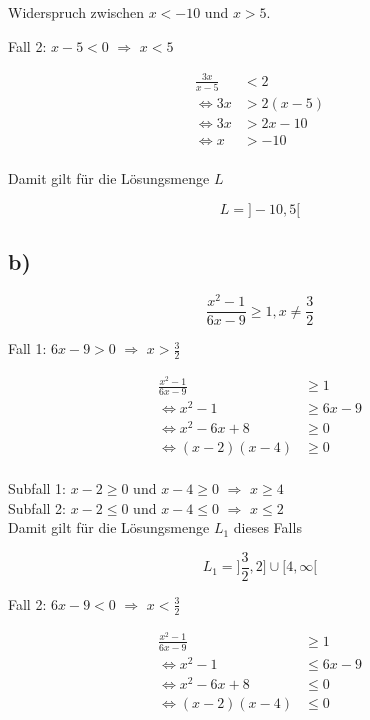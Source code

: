 \documentclass[a4paper, 11pt]{article}
\begin{document}
Widerspruch zwischen \(x < -10\) und \(x > 5\).

Fall 2: \(x - 5 < 0\) \(\Rightarrow\) \(x < 5\)

\begin{align*}
    \frac{3x}{x-5} &< 2 \\
    \Leftrightarrow 3x &> 2(x-5) \\
    \Leftrightarrow 3x &> 2x-10 \\
    \Leftrightarrow x &> -10 \\
\end{align*}

Damit gilt für die Lösungsmenge \(L\)

$$ L = ]-10, 5[ $$

\pagebreak

\subsection{b)}
\label{sec:org7f8df0d}
$$ \frac{x^2 - 1}{6x - 9} \geq 1, x \neq \frac{3}{2} $$

Fall 1: \(6x - 9 > 0\) \(\Rightarrow\) \(x > \frac{3}{2}\)

\begin{align*}
     \frac{x^2 - 1}{6x - 9} &\geq 1 \\
    \Leftrightarrow x^2 - 1 &\geq 6x - 9 \\
    \Leftrightarrow x^2 - 6x + 8 &\geq 0 \\
    \Leftrightarrow (x - 2)(x - 4) &\geq 0 \\
\end{align*}

Subfall 1: \(x - 2 \geq 0\) und \(x - 4 \geq 0\) \(\Rightarrow\) \(x \geq 4\) \\
Subfall 2: \(x - 2 \leq 0\) und \(x - 4 \leq 0\) \(\Rightarrow\) \(x \leq 2\) \\

Damit gilt für die Lösungsmenge \(L_1\) dieses Falls

$$ L_1 = ]\frac{3}{2}, 2] \cup [4, \infty[ $$

Fall 2: \(6x - 9 < 0\) \(\Rightarrow\) \(x < \frac{3}{2}\)

\begin{align*}
    \frac{x^2 - 1}{6x - 9} &\geq 1 \\
    \Leftrightarrow x^2 - 1 &\leq 6x - 9 \\
    \Leftrightarrow x^2 - 6x + 8 &\leq 0 \\
    \Leftrightarrow (x - 2)(x - 4) &\leq 0 \\
\end{align*}
\end{document}
